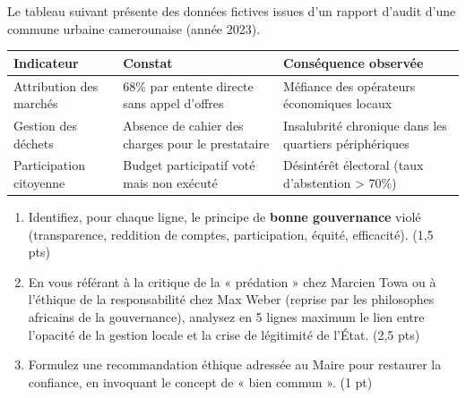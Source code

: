 \documentclass[11pt]{article}
\begin{document}
\begin{exercice}
Le tableau suivant présente des données fictives issues d'un rapport d'audit d'une commune urbaine camerounaise (année 2023).

\begin{tabularx}{\linewidth}{|l|X|X|}
\hline
\textbf{Indicateur} & \textbf{Constat} & \textbf{Conséquence observée} \\
\hline
Attribution des marchés & 68\% par entente directe sans appel d'offres & Méfiance des opérateurs économiques locaux \\
\hline
Gestion des déchets & Absence de cahier des charges pour le prestataire & Insalubrité chronique dans les quartiers périphériques \\
\hline
Participation citoyenne & Budget participatif voté mais non exécuté & Désintérêt électoral (taux d'abstention > 70\%) \\
\hline
\end{tabularx}

\begin{enumerate}
\item Identifiez, pour chaque ligne, le principe de \textbf{bonne gouvernance} violé (transparence, reddition de comptes, participation, équité, efficacité). \hfill (1,5 pts)
\item En vous référant à la critique de la « prédation » chez Marcien Towa ou à l'éthique de la responsabilité chez Max Weber (reprise par les philosophes africains de la gouvernance), analysez en 5 lignes maximum le lien entre l'opacité de la gestion locale et la crise de légitimité de l'État. \hfill (2,5 pts)
\item Formulez une recommandation éthique adressée au Maire pour restaurer la confiance, en invoquant le concept de « bien commun ». \hfill (1 pt)
\end{enumerate}
\end{exercice}
\end{document}
